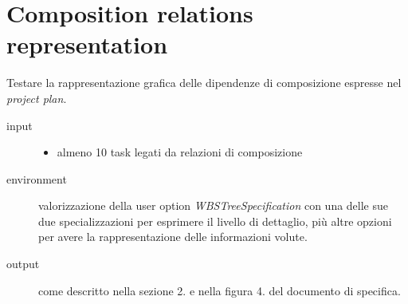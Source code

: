 \section{Composition relations representation}
\label{sec:wbs_compositionRelationsRepresentation}
Testare la rappresentazione grafica delle dipendenze di composizione espresse
nel \emph{project plan}.
\begin{description}
\item[input]  \quad
\begin{itemize}
  \item almeno 10 task legati da relazioni di composizione
\end{itemize}
\item[environment] valorizzazione della user option
\emph{WBSTreeSpecification} con una delle sue due specializzazioni per
esprimere il livello di dettaglio, pi\`u altre opzioni per avere la
rappresentazione delle informazioni volute.
\item[output] come descritto nella sezione 2. e nella figura 4. del
documento di specifica.
\end{description}

